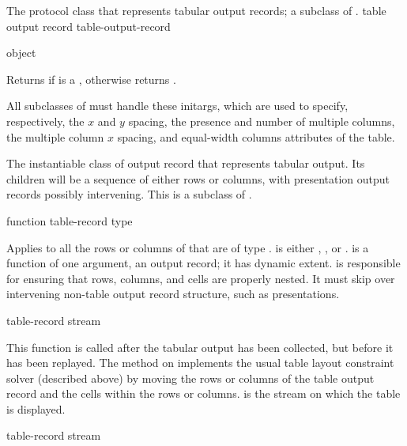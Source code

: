 
The protocol class that represents tabular output records; a subclass of
.
 {table output record} {table-output-record}

 {object}

Returns  if  is a , otherwise
returns .


All subclasses of  must handle these initargs,
which are used to specify, respectively, the $x$ and $y$ spacing, the
presence and number of multiple columns, the multiple column $x$
spacing, and equal-width columns attributes of the table.


The instantiable class of output record that represents tabular output.  Its
children will be a sequence of either rows or columns, with presentation output
records possibly intervening.  This is a subclass of .

 {function table-record type}

Applies  to all the rows or columns of  that
are of type .   is either , , or
.   is a function of one argument, an output
record; it has dynamic extent.   is responsible
for ensuring that rows, columns, and cells are properly nested.  It must skip
over intervening non-table output record structure, such as presentations.

 {table-record stream}

This function is called after the tabular output has been collected, but before
it has been replayed.  The method on 
implements the usual table layout constraint solver (described above) by moving
the rows or columns of the table output record  and the cells
within the rows or columns.     is the stream on which the table is
displayed.

 {table-record stream}

